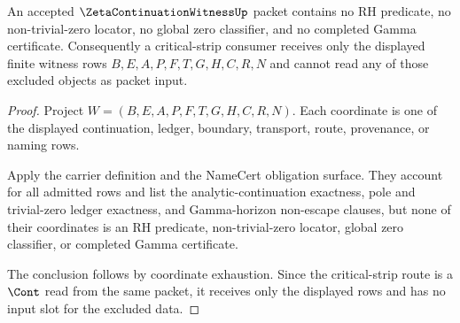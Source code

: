 \begin{theorem}
\label{thm:zeta-continuation-witness-critical-strip-input-refusal}
An accepted $\ZetaContinuationWitnessUp$ packet contains no RH predicate, no non-trivial-zero locator, no global zero classifier, and no completed Gamma certificate. Consequently a critical-strip consumer receives only the displayed finite witness rows $B,E,A,P,F,T,G,H,C,R,N$ and cannot read any of those excluded objects as packet input.
\end{theorem}
\begin{proof}
Project $W=(B,E,A,P,F,T,G,H,C,R,N)$. Each coordinate is one of the displayed continuation, ledger, boundary, transport, route, provenance, or naming rows.

Apply the carrier definition and the NameCert obligation surface. They account for all admitted rows and list the analytic-continuation exactness, pole and trivial-zero ledger exactness, and Gamma-horizon non-escape clauses, but none of their coordinates is an RH predicate, non-trivial-zero locator, global zero classifier, or completed Gamma certificate.

The conclusion follows by coordinate exhaustion. Since the critical-strip route is a $\Cont$ read from the same packet, it receives only the displayed rows and has no input slot for the excluded data.
\end{proof}

